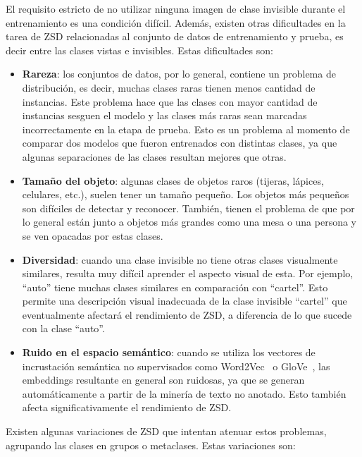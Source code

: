 El requisito estricto de no utilizar ninguna imagen de clase invisible durante el entrenamiento es una condición difícil. Además, existen otras dificultades en la tarea de ZSD relacionadas al conjunto de datos de entrenamiento y prueba, es decir entre las clases vistas e invisibles. Estas dificultades son:

\begin{itemize}
	\item \textbf{Rareza}: los conjuntos de datos, por lo general, contiene un problema de distribución, es decir, muchas clases raras tienen menos cantidad de instancias. Este problema hace que las clases con mayor cantidad de instancias sesguen el modelo y las clases más raras sean marcadas incorrectamente en la etapa de prueba. Esto es un problema al momento de comparar dos modelos que fueron entrenados con distintas clases, ya que algunas separaciones  de las clases resultan mejores que otras.
	
	\item \textbf{Tamaño del objeto}: algunas clases de objetos raros (tijeras, lápices, celulares, etc.), suelen tener un tamaño pequeño. Los objetos más pequeños son difíciles de detectar y reconocer. También, tienen el problema de que por lo general están junto a objetos más grandes como una mesa o una persona y se ven opacadas por estas clases.
	
	\item \textbf{Diversidad}: cuando una clase invisible no tiene otras clases visualmente similares, resulta muy difícil aprender el aspecto visual de esta. Por ejemplo, ``auto'' tiene muchas clases similares en comparación con ``cartel''. Esto permite una descripción visual inadecuada de la clase invisible ``cartel'' que eventualmente afectará el rendimiento de ZSD, a diferencia de lo que sucede con la clase ``auto''.
	
	\item \textbf{Ruido en el espacio semántico}: cuando se utiliza los vectores de incrustación semántica no supervisados como Word2Vec~\cite{mikolov2013distributed} o GloVe~\cite{pennington2014glove}, las embeddings resultante en general son ruidosas, ya que se generan automáticamente a partir de la minería de texto no anotado. Esto también afecta significativamente el rendimiento de ZSD.
\end{itemize}

Existen algunas variaciones de ZSD que intentan atenuar estos problemas, agrupando las clases en grupos o metaclases. Estas variaciones son: 

